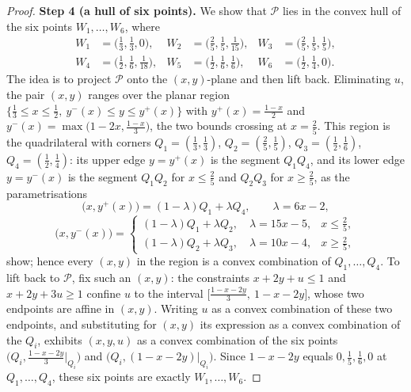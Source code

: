 \documentclass[journal]{IEEEtran}
\theoremstyle{definition}
\newcommand{\cP}{\mathcal{P}}
\begin{document}
\begin{proof}
\textbf{Step 4 (a hull of six points).} We show that $\cP$ lies in the convex hull of the six points $W_1,\dots,W_6$, where
\[
  \begin{aligned}
  W_1&=\bigl(\tfrac13,\tfrac13,0\bigr),&
  W_2&=\bigl(\tfrac25,\tfrac15,\tfrac1{15}\bigr),&
  W_3&=\bigl(\tfrac25,\tfrac15,\tfrac15\bigr),\\
  W_4&=\bigl(\tfrac12,\tfrac16,\tfrac1{18}\bigr),&
  W_5&=\bigl(\tfrac12,\tfrac16,\tfrac16\bigr),&
  W_6&=\bigl(\tfrac12,\tfrac14,0\bigr).
  \end{aligned}
\]
The idea is to project $\cP$ onto the $(x,y)$-plane and then lift back.
Eliminating $u$, the pair $(x,y)$ ranges over the planar region
$\{\tfrac13\le x\le\tfrac12,\ y^-(x)\le y\le y^+(x)\}$ with
$y^+(x)=\tfrac{1-x}2$ and $y^-(x)=\max\bigl(1-2x,\tfrac{1-x}3\bigr)$, the two
bounds crossing at $x=\tfrac25$. This region is the quadrilateral with corners
$Q_1=(\tfrac13,\tfrac13)$, $Q_2=(\tfrac25,\tfrac15)$, $Q_3=(\tfrac12,\tfrac16)$,
$Q_4=(\tfrac12,\tfrac14)$: its upper edge $y=y^+(x)$ is the segment $Q_1Q_4$,
and its lower edge $y=y^-(x)$ is the segment $Q_1Q_2$ for $x\le\tfrac25$ and
$Q_2Q_3$ for $x\ge\tfrac25$, as the parametrisations
\[
  \bigl(x,y^+(x)\bigr)=(1-\lambda)Q_1+\lambda Q_4,\qquad \lambda=6x-2,
\]
\[
  \bigl(x,y^-(x)\bigr)=
  \begin{cases}
  (1-\lambda)Q_1+\lambda Q_2,\quad \lambda=15x-5, & x\le\tfrac25,\\
  (1-\lambda)Q_2+\lambda Q_3,\quad \lambda=10x-4, & x\ge\tfrac25,
  \end{cases}
\]
show; hence every $(x,y)$ in the region is a convex combination of
$Q_1,\dots,Q_4$. To lift back to $\cP$, fix such an $(x,y)$: the constraints
$x+2y+u\le1$ and $x+2y+3u\ge1$ confine $u$ to the interval
$\bigl[\tfrac{1-x-2y}3,\ 1-x-2y\bigr]$, whose two endpoints are affine in
$(x,y)$. Writing $u$ as a convex combination of these two endpoints, and
substituting for $(x,y)$ its expression as a convex combination of the $Q_i$,
exhibits $(x,y,u)$ as a convex combination of the six points
$\bigl(Q_i,\tfrac{1-x-2y}3\big|_{Q_i}\bigr)$ and
$\bigl(Q_i,(1-x-2y)\big|_{Q_i}\bigr)$. Since $1-x-2y$ equals
$0,\tfrac15,\tfrac16,0$ at $Q_1,\dots,Q_4$, these six points are exactly
$W_1,\dots,W_6$.


\end{proof}
\end{document}
